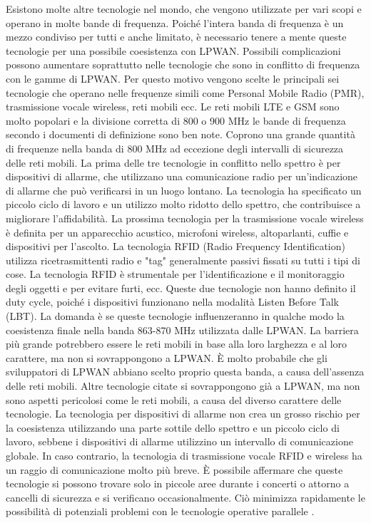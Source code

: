 \documentclass[a4paper]{report} %
\begin{document}
Esistono molte altre tecnologie nel mondo, che vengono utilizzate per vari scopi e operano in molte bande di frequenza. Poiché l'intera banda di frequenza è un mezzo condiviso per tutti e anche limitato, è necessario tenere a mente queste tecnologie per una possibile coesistenza con LPWAN. Possibili complicazioni possono aumentare soprattutto nelle tecnologie che sono in conflitto di frequenza con le gamme di LPWAN. Per questo motivo vengono scelte le principali sei tecnologie che operano nelle frequenze simili come Personal Mobile Radio (PMR), trasmissione vocale wireless, reti mobili ecc. Le reti mobili LTE e GSM sono molto popolari e la divisione corretta di 800 o 900 MHz le bande di frequenza secondo i documenti di definizione sono ben note. Coprono una grande quantità di frequenze nella banda di 800 MHz ad eccezione degli intervalli di sicurezza delle reti mobili. La prima delle tre tecnologie in conflitto nello spettro è per dispositivi di allarme, che utilizzano una comunicazione radio per un'indicazione di allarme che può verificarsi in un luogo lontano. La tecnologia ha specificato un piccolo ciclo di lavoro e un utilizzo molto ridotto dello spettro, che contribuisce a migliorare l'affidabilità. La prossima tecnologia per la trasmissione vocale wireless è definita per un apparecchio acustico, microfoni wireless, altoparlanti, cuffie e dispositivi per l'ascolto. La tecnologia RFID (Radio Frequency Identification) utilizza ricetrasmittenti radio e "tag" generalmente passivi fissati su tutti i tipi di cose. La tecnologia RFID è strumentale per l'identificazione e il monitoraggio degli oggetti e per evitare furti, ecc. Queste due tecnologie non hanno definito il duty cycle, poiché i dispositivi funzionano nella modalità Listen Before Talk (LBT). La domanda è se queste tecnologie influenzeranno in qualche modo la coesistenza finale nella banda 863-870 MHz utilizzata dalle LPWAN. La barriera più grande potrebbero essere le reti mobili in base alla loro larghezza e al loro carattere, ma non si sovrappongono a LPWAN. È molto probabile che gli sviluppatori di LPWAN abbiano scelto proprio questa banda, a causa dell'assenza delle reti mobili. Altre tecnologie citate si sovrappongono già a LPWAN, ma non sono aspetti pericolosi come le reti mobili, a causa del diverso carattere delle tecnologie. La tecnologia per dispositivi di allarme non crea un grosso rischio per la coesistenza utilizzando una parte sottile dello spettro e un piccolo ciclo di lavoro, sebbene i dispositivi di allarme utilizzino un intervallo di comunicazione globale. In caso contrario, la tecnologia di trasmissione vocale RFID e wireless ha un raggio di comunicazione molto più breve. È possibile affermare che queste tecnologie si possono trovare solo in piccole aree durante i concerti o attorno a cancelli di sicurezza e si verificano occasionalmente. Ciò minimizza rapidamente le possibilità di potenziali problemi con le tecnologie operative parallele \cite{art:rif.46}.
\end{document}
